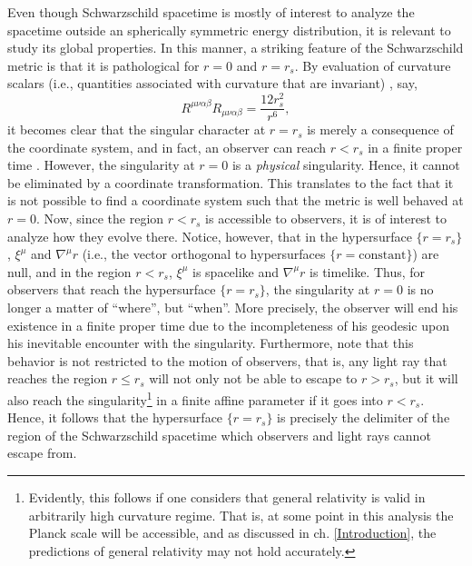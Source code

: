 \documentclass[
12pt,		%
openright,	%
twoside,  %
a4paper,			%
chapter=TITLE,		%
english,			%
french,				%
spanish,			%
brazil				%
]{USPSC-classe/USPSC}
\begin{document}
Even though Schwarzschild spacetime is mostly of interest to analyze the spacetime outside an spherically symmetric energy distribution, it is relevant to study its global properties. In this manner, a striking feature of the Schwarzschild metric is that it is pathological for $r=0$ and $r=r_s$. By evaluation of curvature scalars (i.e., quantities associated with curvature that are invariant) \cite{Misner1973}, say,  
\begin{equation}\label{curvature}
    R^{\mu\nu\alpha\beta}R_{\mu\nu\alpha\beta}=\frac{12r^2_s}{r^6},
\end{equation}
it becomes clear that the singular character at $r=r_s$ is merely a consequence of the coordinate system, and in fact, an observer can reach $r<r_s$ in a finite proper time \cite{Misner1973}. However, the singularity at $r=0$ is a \textit{physical} singularity. Hence, it cannot be eliminated by a coordinate transformation. This translates to the fact that it is not possible to find a coordinate system such that the metric is well behaved at $r=0$. Now, since the region $r<r_s$ is accessible to observers, it is of interest to analyze how they evolve there. Notice, however, that in the hypersurface $\{r=r_s\}$, $\xi^{\mu}$ and $\nabla^{\mu}r$ (i.e., the vector orthogonal to hypersurfaces $\{r=\text{constant}\}$) are null, and in the region $r<r_s$, $\xi^{\mu}$ is spacelike and $\nabla^{\mu}r$ is timelike. Thus, for observers that reach the hypersurface $\{r=r_s\}$, the singularity at $r=0$ is no longer a matter of “where”, but “when”. More precisely, the observer will end his existence in a finite proper time due to the incompleteness of his geodesic upon his inevitable encounter with the singularity. Furthermore, note that this behavior is not restricted to the motion of observers, that is, any light ray that reaches the region $r\leq r_s$ will not only not be able to escape to $r>r_s$, but it will also reach the singularity\footnote{Evidently, this follows if one considers that general relativity is valid in arbitrarily high curvature regime. That is, at some point in this analysis the Planck scale will be accessible, and as discussed in ch. \ref{Introduction}, the predictions of general relativity may not hold accurately.} in a finite affine parameter if it goes into $r<r_s$. Hence, it follows that the hypersurface $\{r=r_s\}$ is precisely the delimiter of the region of the Schwarzschild spacetime which observers and light rays cannot escape from.
\end{document}
